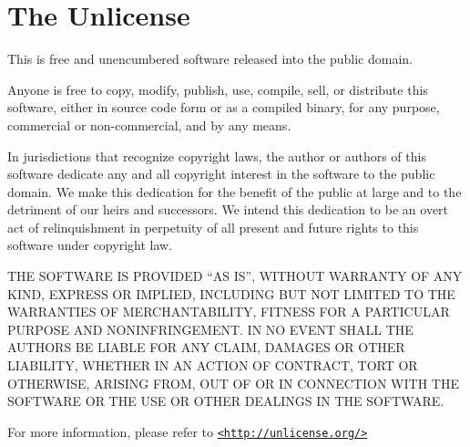\chapter{The Unlicense}

This is free and unencumbered software released into the public domain.

Anyone is free to copy, modify, publish, use, compile, sell, or
distribute this software, either in source code form or as a compiled
binary, for any purpose, commercial or non-commercial, and by any
means.

In jurisdictions that recognize copyright laws, the author or authors
of this software dedicate any and all copyright interest in the
software to the public domain. We make this dedication for the benefit
of the public at large and to the detriment of our heirs and
successors. We intend this dedication to be an overt act of
relinquishment in perpetuity of all present and future rights to this
software under copyright law.

\MakeUppercase{%
    The software is provided ``as is'', without warranty of any kind,
    express or implied, including but not limited to the warranties of
    merchantability, fitness for a particular purpose and noninfringement.
    In no event shall the authors be liable for any claim, damages or
    other liability, whether in an action of contract, tort or otherwise,
    arising from, out of or in connection with the software or the use or
    other dealings in the software.%
}

For more information, please refer to
\href{http://unlicense.org/}{\lstinline`<http://unlicense.org/>`}
